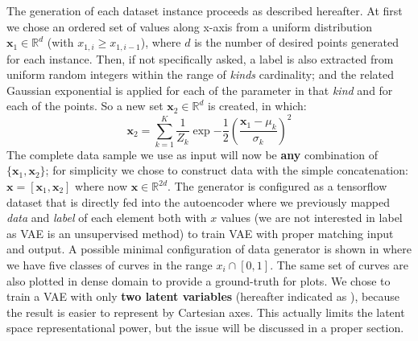 %
The generation of each dataset instance proceeds as described hereafter. At first we chose an ordered set of values along x-axis from a uniform distribution $\bm{x}_1 \in \mathbb{R}^{d}$ (with $x_{1,i} \geq x_{1,i-1}$), where $d$ is the number of desired points generated for each instance. Then, if not specifically asked, a label is also extracted from uniform random integers within the range of \textit{kinds} cardinality; and the related Gaussian exponential is applied for each of the parameter in that \textit{kind} and for each of the points. So a new set $\bm{x}_2 \in \mathbb{R}^d$ is created, in which:
\begin{equation}
    \bm{x}_2 = \sum_{k=1}^K \frac{1}{Z_k} \exp{-\frac{1}{2}\left( \frac{\bm{x}_1-\mu_k}{\sigma_k}\right)^2}
\end{equation}
The complete data sample we use as input will now be \textbf{any} combination of $\{\bm{x}_1, \bm{x}_2\}$; for simplicity we chose to construct data with the simple concatenation: $\bm{x} = [\bm{x}_1, \bm{x}_2]$ where now $\bm{x} \in \mathbb{R}^{2d}$.
The generator is configured as a tensorflow dataset that is directly fed into the autoencoder where we previously mapped \textit{data} and \textit{label} of each element both with $x$ values (we are not interested in label as VAE is an unsupervised method) to train \acs{VAE} with proper matching input and output.
A possible minimal configuration of data generator is shown in \Figure{\ref{fig:sum_of_gaussians}} where we have five classes of curves in the range $x_i \cap [0,1]$. The same set of curves are also plotted in dense domain to provide a ground-truth for plots. We chose to train a \acs{VAE} with only \textbf{two latent variables} (hereafter indicated as ), because the result is easier to represent by Cartesian axes. This actually limits the latent space representational power, but the issue will be discussed in a proper section.
%
